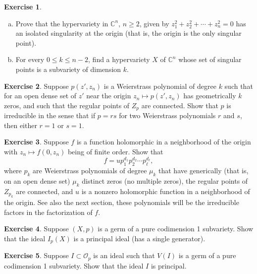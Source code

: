 \documentclass[12pt,openany]{book}
\newcommand{\C}{{\mathbb{C}}}
\newcommand{\sO}{{\mathscr{O}}}
\theoremstyle{plain}
\theoremstyle{remark}
\theoremstyle{definition}
\newenvironment{exbox}{%
    \def\FrameCommand{\vrule width 1pt \relax\hspace{10pt}}%
    \MakeFramed{\advance\hsize-\width\FrameRestore}%
}{%
    \endMakeFramed
}
\newenvironment{exparts}{%
    \leavevmode\begin{enumerate}[a),noitemsep,topsep=0pt,parsep=0pt,partopsep=0pt]
}{%
    \end{enumerate}
}
\theoremstyle{exercise}
\newtheorem{exercise}{Exercise}[section]
\theoremstyle{example}
\begin{document}
\begin{exbox}
\begin{exercise}
\begin{exparts}
\item
Prove that the hypervariety in $\C^n$, $n \geq 2$, given by $z_1^2 + z_2^2 + \cdots + z_n^2 = 0$
has an isolated singularity at the origin (that is, the origin is the only
singular point).
\item
For every $0 \leq k \leq n-2$, find a hypervariety $X$ of $\C^n$ whose set
of singular points is a subvariety of dimension $k$.
\end{exparts}
\end{exercise}

\begin{exercise}
Suppose $p(z',z_n)$ is a Weierstrass polynomial of degree $k$ such that
for an open dense set of $z'$ near the origin
$z_n \mapsto p(z',z_n)$ has geometrically $k$ zeros, and such that the
regular points of $Z_p$ are connected.  Show that $p$ is
irreducible in the sense that if $p = rs$ for two Weierstrass polynomials
$r$ and $s$, then either $r=1$ or $s=1$.
\end{exercise}

\begin{samepage}
\begin{exercise}
Suppose $f$ is a function holomorphic in a neighborhood of the origin with
$z_n \mapsto f(0,z_n)$ being of finite order.  Show that
\begin{equation*}
f = u p_1^{d_1} p_2^{d_2} \cdots p_\ell^{d_\ell} ,
\end{equation*}
where $p_k$ are Weierstrass polynomials of degree $\mu_k$ that have
generically (that is, on an open dense set) $\mu_k$ distinct zeros
(no multiple zeros), the regular points of $Z_{p_k}$ are
connected, and $u$ is a nonzero holomorphic function
in a neighborhood of the origin.  See also the next section, these
polynomials will be the irreducible factors in the factorization of $f$.
\end{exercise}
\end{samepage}

\begin{exercise}
Suppose $(X,p)$ is a germ of a pure codimension 1 subvariety.  Show that
the ideal $I_p(X)$ is a principal ideal (has a single generator).
\end{exercise}

\begin{exercise}
Suppose $I \subset \sO_p$ is an ideal such that $V(I)$ is a germ of a pure codimension 1 subvariety.  Show that
the ideal $I$ is principal.
\end{exercise}


\end{exbox}
\end{document}
